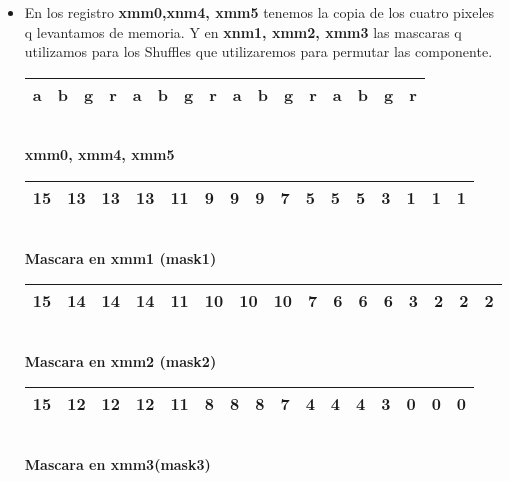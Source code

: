\begin{itemize}

	\item En los registro \textbf{xmm0,xnm4, xmm5} tenemos la copia de los cuatro pixeles q levantamos de memoria.
			Y en \textbf{xnm1, xmm2, xmm3} las mascaras q utilizamos para los Shuffles que utilizaremos para permutar las componente.

		\begin{center}
		   \begin{tabular}{| c | c | c | c || c | c | c | c || c | c | c | c || c | c | c | c |}
			 \hline
			 a & b & g & r & a & b & g & r & a & b & g & r & a & b & g & r \\ \hline

		   \end{tabular}
		   \\ \textbf{xmm0, xmm4, xmm5}
		\end{center}
		 
		\begin{center}
		   \begin{tabular}{| c | c | c | c || c | c | c | c || c | c | c | c || c | c | c | c |}
			 \hline
			 15 & 13 & 13 & 13 & 11 & 9 & 9 & 9 & 7 & 5 & 5 & 5 & 3 & 1 & 1 & 1 \\ \hline
		   \end{tabular}
		   \\  \textbf{Mascara en xmm1 (mask1)}
		\end{center}

		\begin{center}
		   \begin{tabular}{| c | c | c | c || c | c | c | c || c | c | c | c || c | c | c | c |}
			 \hline
			 15 & 14 & 14 & 14 & 11 & 10 & 10 & 10 & 7 & 6 & 6 & 6 & 3 & 2 & 2 & 2 \\ \hline
		   \end{tabular}
		   \\ \textbf{Mascara en xmm2 (mask2)}
		\end{center}

		\begin{center}
		   \begin{tabular}{| c | c | c | c || c | c | c | c || c | c | c | c || c | c | c | c |}
			 \hline
			 15 & 12 & 12 & 12 & 11 & 8 & 8 & 8 & 7 & 4 & 4 & 4 & 3 & 0 & 0 & 0 \\ \hline
		   \end{tabular}
		   \\ \textbf{Mascara en xmm3(mask3)}
		\end{center}


\end{itemize}

